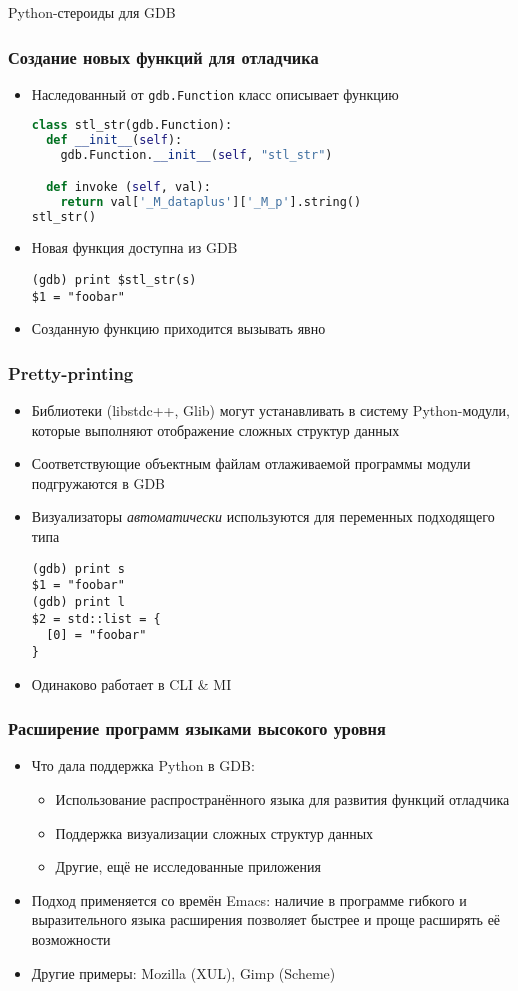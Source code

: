 \documentclass[onlymath]{beamer}
\newcommand\code\texttt
\begin{document}
\begin{subsection}{Python-стероиды для GDB}
\begin{frame}[fragile]
  \frametitle{Создание новых функций для отладчика}
  \begin{itemize}
  \item Наследованный от \code{gdb.Function} класс описывает функцию
\begin{lstlisting}[language=Python]
class stl_str(gdb.Function):
  def __init__(self):
    gdb.Function.__init__(self, "stl_str")

  def invoke (self, val):
    return val['_M_dataplus']['_M_p'].string()
stl_str()
\end{lstlisting}
  \item Новая функция доступна из GDB
\begin{lstlisting}[style=gdbsession]
(gdb) print $stl_str(s)
$1 = "foobar"
\end{lstlisting}
  \item Созданную функцию приходится вызывать явно
  \end{itemize}
\end{frame}  

\begin{frame}[fragile]
  \frametitle{Pretty-printing}
  \begin{itemize}
  \item Библиотеки (libstdc++, Glib) могут устанавливать в систему
    Python-модули, которые выполняют отображение сложных структур
    данных
  \item Соответствующие объектным файлам отлаживаемой программы модули
    подгружаются в GDB
  \item Визуализаторы \emph{автоматически} используются для переменных
    подходящего типа
\begin{lstlisting}[style=gdbsession]
(gdb) print s
$1 = "foobar"
(gdb) print l
$2 = std::list = {
  [0] = "foobar"
}
\end{lstlisting}
  \item Одинаково работает в CLI \& MI
  \end{itemize}
\end{frame}
\end{subsection}

\begin{frame}
  \frametitle{Расширение программ языками высокого уровня}
  \begin{itemize}
  \item Что дала поддержка Python в GDB:
    \begin{itemize}
    \item Использование распространённого языка для развития функций
      отладчика
    \item Поддержка визуализации сложных структур данных
    \item Другие, ещё не исследованные приложения
    \end{itemize}
  \item Подход применяется со времён Emacs: наличие в программе
    гибкого и выразительного языка расширения позволяет быстрее и
    проще расширять её возможности
  \item Другие примеры: Mozilla (XUL), Gimp (Scheme)
  \end{itemize}
\end{frame}
\end{document}
